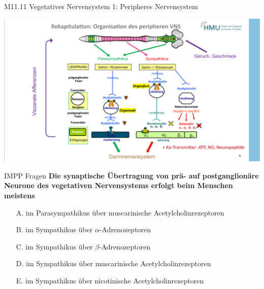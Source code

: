 \documentclass{beamer}
\begin{document}
\begin{frame}{M11.11 Vegetatives Nervensystem 1: Peripheres Nervensystem}

\begin{center}
    \includegraphics[width=\textwidth]{peripheres_VNS.png}
\end{center}

    
\end{frame}







\begin{frame}{IMPP Fragen}
\textbf{Die synaptische Übertragung von prä- auf postganglionäre Neurone des vegetativen Nervensystems erfolgt beim Menschen meistens} \\[0.2 cm]

\begin{itemize}
\item[A.] im Parasympathikus über muscarinische Acetylcholinrezeptoren
\item[B.] im Sympathikus über \(\alpha\)-Adrenozeptoren
\item[C.] im Sympathikus über \(\beta\)-Adrenozeptoren
\item[D.] im Sympathikus über muscarinische Acetylcholinrezeptoren
\item[E.] im Sympathikus über nicotinische Acetylcholinrezeptoren %

\end{itemize}
\end{frame}
\end{document}
